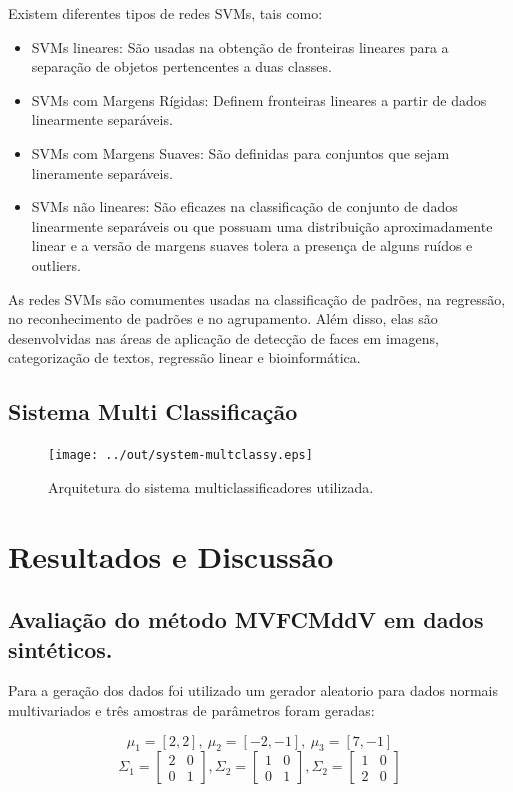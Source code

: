 \documentclass[12pt]{article}
\begin{document}
Existem diferentes tipos de redes SVMs, tais como:
\begin{itemize}
    \item SVMs lineares: São usadas na obtenção de fronteiras lineares para a separação de objetos pertencentes a duas classes.
    \item SVMs com Margens Rígidas: Definem fronteiras lineares a partir de dados linearmente separáveis.
    \item  SVMs com Margens Suaves: São definidas para conjuntos que sejam lineramente separáveis.
    \item SVMs não lineares: São eficazes na classificação de conjunto de dados linearmente separáveis ou que possuam uma distribuição aproximadamente linear e a versão de margens suaves tolera a presença de alguns ruídos e outliers.
\end{itemize}

As redes SVMs são comumentes usadas na classificação de padrões, na regressão, no reconhecimento de padrões e no agrupamento. Além disso, elas são desenvolvidas nas áreas de aplicação de detecção de faces em imagens, categorização de textos, regressão linear e bioinformática.



\subsection{Sistema Multi Classificação}


\begin{figure}[h]
\centering
\texttt{[image: ../out/system-multclassy.eps]}
\caption{Arquitetura do sistema multiclassificadores utilizada.}
\label{fig:mult_system_classy}
\end{figure}  


\section{Resultados e Discussão}\label{RD}

\subsection{Avaliação do método MVFCMddV em dados sintéticos.}
Para a geração dos dados foi utilizado um gerador aleatorio para dados normais multivariados e três amostras de parâmetros  foram geradas:

$$\mu_1 = [2, 2], \ \mu_2 = [-2, -1], \ \mu_3 = [7, -1] $$
$$\Sigma_1 = \left[ \begin{matrix}
2 & 0 \\ 
0 & 1
\end{matrix} \right], 
\Sigma_2 = \left[ \begin{matrix}
1 & 0 \\ 
0 & 1
\end{matrix} \right], 
\Sigma_2 = \left[ \begin{matrix}
1 & 0 \\ 
2 & 0
\end{matrix} \right] $$
\end{document}
